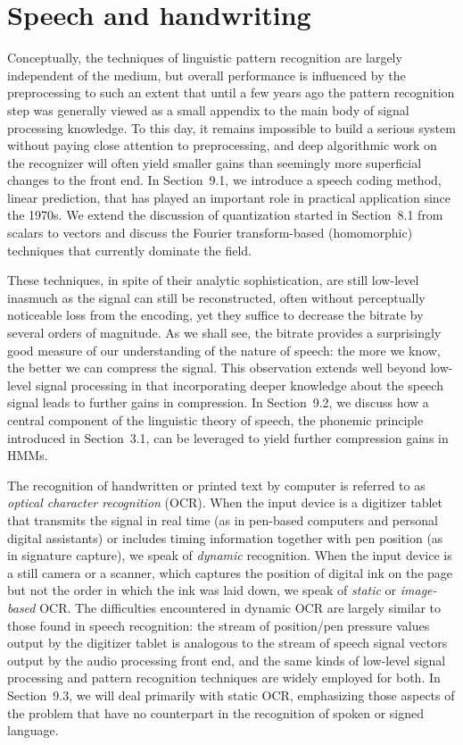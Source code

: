 \chapter{Speech and handwriting}

Conceptually, the techniques of linguistic pattern recognition are largely
independent of the medium, but overall performance is influenced by the
preprocessing to such an extent that until a few years ago the pattern
recognition step was generally viewed as a small appendix to the main body of
signal processing knowledge. To this day, it remains impossible to build a
serious system without paying close attention to preprocessing, and deep
algorithmic work on the recognizer will often yield smaller gains than
seemingly more superficial changes to the front end. In Section~9.1, we
introduce a speech coding method, linear prediction, that has played an
important role in practical application since the 1970s. We extend the
discussion of quantization started in Section~8.1 from scalars to vectors and
discuss the Fourier transform-based (homomorphic) techniques that currently
dominate the field.

These techniques, in spite of their analytic sophistication, are still
low-level inasmuch as the signal can still be reconstructed, often without
perceptually noticeable loss from the encoding, yet they suffice to decrease
the bitrate by several orders of magnitude.  As we shall see, the bitrate
provides a surprisingly good measure of our understanding of the nature of
speech: the more we know, the better we can compress the signal. This
observation extends well beyond low-level signal processing in that
incorporating deeper knowledge about the speech signal leads to further gains
in compression. In Section~9.2, we discuss how a central component of the
linguistic theory of speech, the phonemic principle introduced in Section~3.1,
can be leveraged to yield further compression gains in HMMs.

The recognition of handwritten or printed text by computer is referred to as
{\it optical character recognition} (OCR). 
When the input device is a digitizer tablet that transmits
the signal in real time (as in pen-based computers and personal digital
assistants) or includes timing information together with pen position (as in
signature capture), we speak of {\it dynamic} recognition. When the input
device is a still camera or a scanner, which captures the position of digital
ink on the page but not the order in which the ink was laid down, we speak of
{\it static} or {\it image-based} OCR. The difficulties encountered in dynamic
OCR are largely similar to those found in speech recognition: the stream of
position/pen pressure values output by the digitizer tablet is analogous to
the stream of speech signal vectors output by the audio processing front end,
and the same kinds of low-level signal processing and pattern recognition
techniques are widely employed for both. In Section~9.3, we will deal primarily
with static OCR, emphasizing those aspects of the problem that have no
counterpart in the recognition of spoken or signed language.

